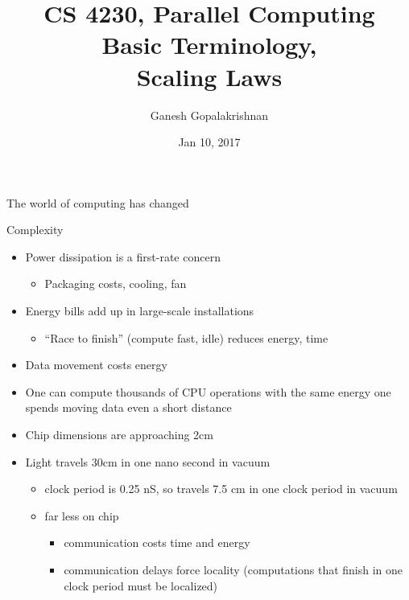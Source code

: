 \documentclass{beamer}
\title[]{CS 4230, Parallel Computing\\
   Basic Terminology, \\
   Scaling Laws}
\author{Ganesh Gopalakrishnan}
\institute{School of Computing, Univ of Utah}
\date{Jan 10, 2017}
\begin{document}
\begin{frame}
  \titlepage
\end{frame}







\begin{frame}{The world of computing has changed}

\noindent Complexity
\begin{itemize}
\item Power dissipation is a first-rate concern
  \begin{itemize}
  \item Packaging costs, cooling, fan
  \end{itemize}
\item Energy bills add up in large-scale installations
  \begin{itemize}
  \item ``Race to finish'' (compute fast, idle) reduces energy, time
  \end{itemize}
\item Data movement costs energy
\item One can compute thousands of CPU operations 
  with the same energy one spends moving data even a short distance
\item Chip dimensions are approaching 2cm
\item Light travels 30cm in one nano second in vacuum
  \begin{itemize}
  \item clock period is 0.25 nS, so travels 7.5 cm in one clock period
    in vacuum
  \item far less on chip
    \begin{itemize}
    \item communication costs time and energy
    \item communication delays force locality (computations that  
  finish in one clock period must be localized)
    \end{itemize}
  \end{itemize}
\end{itemize}
 
\end{frame}
\end{document}
